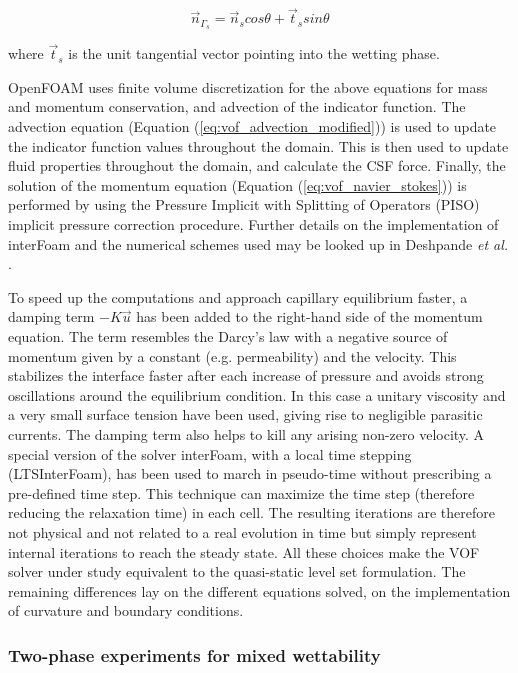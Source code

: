 \begin{equation}
\vec{n}_{\Gamma_s} = \vec{n}_s cos \theta + \vec{t}_s sin \theta
\end{equation}

where $\vec{t}_s$ is the unit tangential vector pointing into the wetting phase. 

OpenFOAM uses finite volume discretization for the above equations for mass and momentum conservation, and advection of the indicator function. The advection equation (Equation (\ref{eq:vof_advection_modified})) is used to update the indicator function values throughout the domain. This is then used to update fluid properties throughout the domain, and calculate the CSF force. Finally, the solution of the momentum equation (Equation (\ref{eq:vof_navier_stokes})) is performed by using the Pressure Implicit with Splitting of Operators (PISO) implicit pressure correction procedure. Further details on the implementation of interFoam and the numerical schemes used may be looked up in Deshpande \emph{et al.} \cite{deshpande2012evaluating}.

To speed up the computations and approach capillary equilibrium faster, a damping term  $-K\vec{u}$ has been added to the right-hand side of the momentum equation. The term resembles the Darcy's law with a negative source of momentum given by a constant (e.g. permeability) and the velocity. This stabilizes the interface faster after each increase of pressure and avoids strong oscillations around the equilibrium condition. In this case a unitary viscosity and a very small surface tension have been used, giving rise to negligible parasitic currents. The damping term also helps to kill any arising non-zero velocity. A special version of the solver interFoam, with a local time stepping (LTSInterFoam), has been used to march in pseudo-time without prescribing a pre-defined time step. This technique can maximize the time step (therefore reducing the relaxation time) in each cell. The resulting iterations are therefore not physical and not related to a real evolution in time but simply represent internal iterations to reach the steady state. All these choices make the VOF solver under study equivalent to the quasi-static level set formulation. The remaining differences lay on the different equations solved, on the implementation of curvature and boundary conditions.


\subsubsection{Two-phase experiments for mixed wettability}

